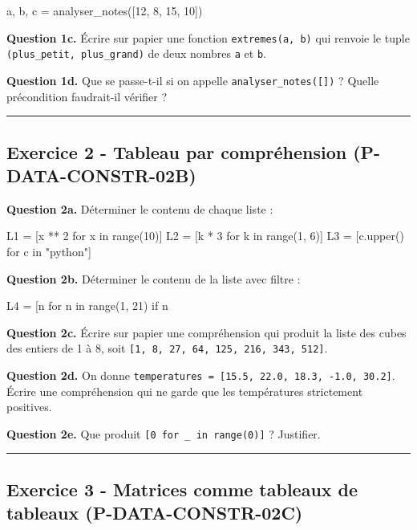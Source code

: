 \begin{python}
a, b, c = analyser_notes([12, 8, 15, 10])
\end{python}

\textbf{Question 1c.} Écrire sur papier une fonction
\texttt{extremes(a,\ b)} qui renvoie le tuple
\texttt{(plus\_petit,\ plus\_grand)} de deux nombres \texttt{a} et
\texttt{b}.

\textbf{Question 1d.} Que se passe-t-il si on appelle
\texttt{analyser\_notes({[}{]})} ? Quelle précondition faudrait-il
vérifier ?

\begin{center}\rule{0.5\linewidth}{0.5pt}\end{center}

\subsection{Exercice 2 - Tableau par compréhension (P-DATA-CONSTR-02B)}

\textbf{Question 2a.} Déterminer le contenu de chaque liste :

\begin{python}
L1 = [x ** 2 for x in range(10)]
L2 = [k * 3 for k in range(1, 6)]
L3 = [c.upper() for c in "python"]
\end{python}

\textbf{Question 2b.} Déterminer le contenu de la liste avec filtre :

\begin{python}
L4 = [n for n in range(1, 21) if n %
\end{python}

\textbf{Question 2c.} Écrire sur papier une compréhension qui produit la
liste des cubes des entiers de 1 à 8, soit
\texttt{{[}1,\ 8,\ 27,\ 64,\ 125,\ 216,\ 343,\ 512{]}}.

\textbf{Question 2d.} On donne
\texttt{temperatures\ =\ {[}15.5,\ 22.0,\ 18.3,\ -1.0,\ 30.2{]}}. Écrire
une compréhension qui ne garde que les températures strictement
positives.

\textbf{Question 2e.} Que produit
\texttt{{[}0\ for\ \_\ in\ range(0){]}} ? Justifier.

\begin{center}\rule{0.5\linewidth}{0.5pt}\end{center}

\subsection{Exercice 3 - Matrices comme tableaux de tableaux (P-DATA-CONSTR-02C)}

